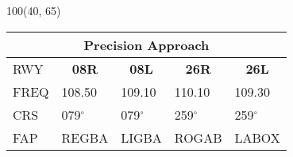 \documentclass[10pt,landscape,a4paper]{article}
\begin{document}
\begin{textblock}{100}(40, 65)
\begin{table}[]
\begin{tabular}{lllll}
\multicolumn{5}{c}{\textbf{Precision Approach}} \\ \hline
\multicolumn{1}{|l|}{RWY} & \multicolumn{1}{c|}{\textbf{08R}} & \multicolumn{1}{c|}{\textbf{08L}} & \multicolumn{1}{c|}{\textbf{26R}} & \multicolumn{1}{c|}{\textbf{26L}} \\ \hline
\multicolumn{1}{|l|}{FREQ} & \multicolumn{1}{l|}{108.50} & \multicolumn{1}{l|}{109.10} & \multicolumn{1}{l|}{110.10} & \multicolumn{1}{l|}{109.30} \\
\multicolumn{1}{|l|}{CRS} & \multicolumn{1}{l|}{079$^\circ$} & \multicolumn{1}{l|}{079$^\circ$} & \multicolumn{1}{l|}{259$^\circ$} & \multicolumn{1}{l|}{259$^\circ$} \\
\multicolumn{1}{|l|}{FAP} & \multicolumn{1}{l|}{REGBA} & \multicolumn{1}{l|}{LIGBA} & \multicolumn{1}{l|}{ROGAB} & \multicolumn{1}{l|}{LABOX} \\ \hline
\end{tabular}
\end{table}
\end{textblock}
\end{document}
